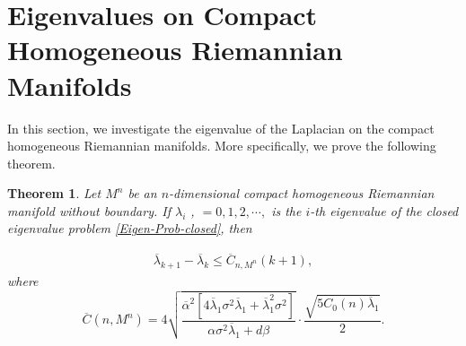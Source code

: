 \documentclass[12pt]{article}
\newtheorem{thm}{Theorem}[section]
\numberwithin{equation}{section}
\begin{document}
\section{Eigenvalues on Compact Homogeneous Riemannian Manifolds}\label{sec6}

In this section, we investigate the eigenvalue of the Laplacian on the compact homogeneous Riemannian manifolds. More specifically, we prove
the following theorem.
\begin{thm}\label{thm-homo}
Let $M^{n}$ be an $n$-dimensional compact homogeneous Riemannian
manifold without boundary.   If $\lambda_{i}$ , $ = 0, 1, 2,\cdots,$ is the $i$-th eigenvalue of
the closed eigenvalue problem \eqref{Eigen-Prob-closed}, then


\begin{equation*}\begin{aligned}\overline{\lambda}_{k+1}-\overline{\lambda}_{k}\leq
\overline{C}_{n,M^{n}}(k+1),\end{aligned}
\end{equation*}
where $$\overline{C}(n,M^{n})=4\sqrt{\frac{\overline{\alpha}^{2}\left[4\overline{\lambda}_{1}\sigma^{2}\overline{\lambda}_{1} +\overline{\lambda}^{2}_{1}
\sigma^{2}\right]}{\alpha\sigma^{2}\overline{\lambda}_{1}+d\beta}}\cdot\frac{\sqrt{5C_{0}(n)\overline{\lambda}_{1}}}{2}.$$\end{thm}
\end{document}
